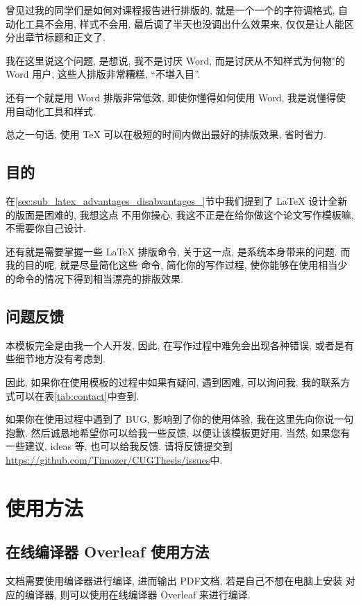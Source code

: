 \documentclass[doctor]{cugthesis}
\begin{document}
    曾见过我的同学们是如何对课程报告进行排版的, 就是一个一个的字符调格式, 自动化工具不会用, 样式不会用,
    最后调了半天也没调出什么效果来, 仅仅是让人能区分出章节标题和正文了.

    我在这里说这个问题, 是想说, 我不是讨厌 Word, 而是讨厌从不知样式为何物"的 Word 用户, 这些人排版非常糟糕,
    ``不堪入目''.

    还有一个就是用 Word 排版非常低效, 即使你懂得如何使用 Word, 我是说懂得使用自动化工具和样式.

    总之一句话, 使用 \TeX{} 可以在极短的时间内做出最好的排版效果, 省时省力.

\section{目的}
\label{sec:mu_di_}
    在\ref{sec:sub_latex_advantages_disabvantages_}节中我们提到了 \LaTeX{} 设计全新的版面是困难的, 我想这点
    不用你操心, 我这不正是在给你做这个论文写作模板嘛, 不需要你自己设计.

    还有就是需要掌握一些 \LaTeX{} 排版命令, 关于这一点, 是系统本身带来的问题. 而我的目的呢, 就是尽量简化这些
    命令, 简化你的写作过程, 使你能够在使用相当少的命令的情况下得到相当漂亮的排版效果.

\section{问题反馈}
\label{sec:wen_ti_fan_kui_}
    本模板完全是由我一个人开发, 因此, 在写作过程中难免会出现各种错误, 或者是有些细节地方没有考虑到.

    因此, 如果你在使用模板的过程中如果有疑问, 遇到困难, 可以询问我, 我的联系方式可以在表\ref{tab:contact}中查到.
    
    如果你在使用过程中遇到了 BUG, 影响到了你的使用体验, 我在这里先向你说一句抱歉.
    然后诚恳地希望你可以给我一些反馈, 以便让该模板更好用. 当然, 如果您有一些建议, ideas 等, 也可以给我反馈. 
    请将反馈提交到
    \url{https://github.com/Timozer/CUGThesis/issues}中.


\chapter{使用方法}

\section{在线编译器 Overleaf 使用方法}
\label{sec:overleaf_usage}

\LaTeXe{} 文档需要使用编译器进行编译, 进而输出 PDF文档, 若是自己不想在电脑上安装
对应的编译器, 则可以使用在线编译器 Overleaf 来进行编译.
\end{document}
